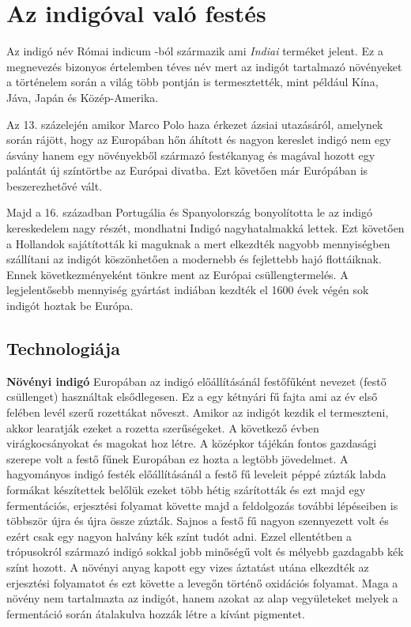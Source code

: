 \documentclass[fontsize=12pt, appendixprefix=true]{scrreprt}
\begin{document}
\chapter{Az indigóval való festés}
Az indigó név Római indicum -ból származik ami \textit{Indiai} terméket jelent.
Ez a megnevezés bizonyos értelemben téves név mert az indigót tartalmazó növényeket a történelem során a világ több pontján is termesztették, mint például Kína, Jáva, Japán és Közép-Amerika.  

Az 13. százelején amikor Marco Polo haza érkezet ázsiai utazásáról, amelynek során rájött, hogy az Europában hőn áhított és nagyon kereslet indigó nem egy ásvány hanem egy növényekből származó festékanyag és magával hozott egy palántát új színtörtbe az Európai divatba. Ezt követően már Európában is beszerezhetővé vált.

Majd a 16. században Portugália és Spanyolország bonyolította le az indigó kereskedelem nagy részét, mondhatni Indigó nagyhatalmakká lettek.
Ezt követően a Hollandok sajátították ki maguknak a mert elkezdték nagyobb mennyiségben szállítani az indigót köszönhetően a modernebb és fejlettebb hajó flottáiknak. Ennek következményeként tönkre ment az Európai  csüllengtermelés. A legjelentősebb mennyiség gyártást indiában kezdték el 1600 évek végén sok indigót hoztak be Európa.
 
\section{Technologiája}
 \textbf{Növényi indigó}
 Europában az indigó előállításánál festőfűként nevezet (festő csüllenget) használtak elsődlegesen. Ez a egy kétnyári fű fajta ami az év első felében levél szerű rozettákat nőveszt.
 Amikor az indigót kezdik el termeszteni, akkor learatják ezeket a rozetta szerűségeket. A következő évben virágkocsányokat és magokat hoz létre.
 A középkor tájékán fontos gazdasági szerepe volt a festő fűnek Europában ez hozta a legtöbb jövedelmet.  
 A hagyományos indigó festék előállításánál a festő fű leveleit péppé zúzták labda formákat készítettek belőlük ezeket több hétig szárították és ezt majd egy fermentációs, erjesztési folyamat követte majd a feldolgozás további lépéseiben is többször újra és újra össze zúzták.
 Sajnos a festő fű nagyon szennyezett volt és ezért csak egy nagyon halvány kék színt tudót adni.
 Ezzel ellentétben a trópusokról származó indigó sokkal jobb minőségű volt és mélyebb gazdagabb kék színt hozott.
 A növényi anyag kapott egy vizes áztatást utána elkezdték az erjesztési folyamatot és ezt követte a levegőn történő oxidációs folyamat. Maga a növény nem tartalmazta az indigót, hanem azokat az alap vegyületeket melyek a fermentáció során átalakulva hozzák létre a kívánt pigmentet.
\end{document}
